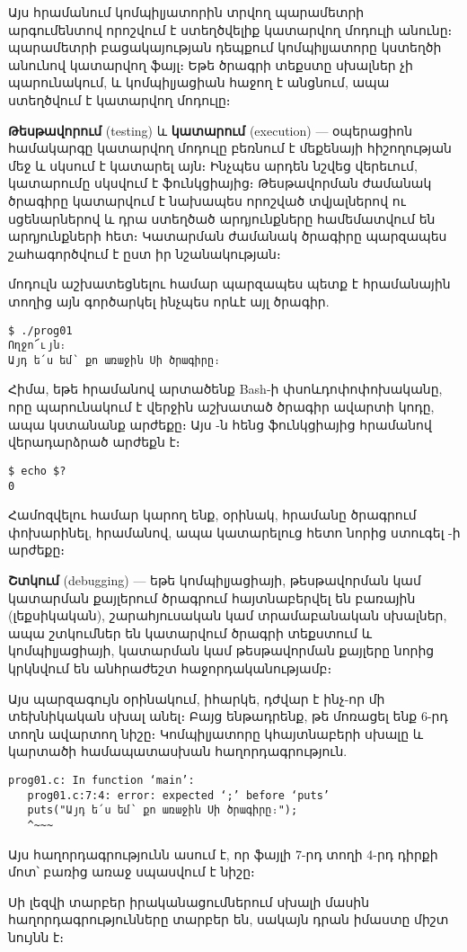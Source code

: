Այս հրամանում կոմպիլյատորին տրվող  պարամետրի արգումենտով
որոշվում է ստեղծվելիք կատարվող մոդուլի անունը։  պարամետրի
բացակայության դեպքում կոմպիլյատորը կստեղծի  անունով
կատարվող ֆայլ։ Եթե ծրագրի տեքստը սխալներ չի պարունակում, և կոմպիլյացիան
հաջող է անցնում, ապա ստեղծվում է  կատարվող մոդուլը։

\textbf{Թեսթավորում} (testing) և \textbf{կատարում} (execution) ---
օպերացիոն համակարգը կատարվող մոդուլը բեռնում է մեքենայի հիշողության
մեջ և սկսում է կատարել այն։ Ինչպես արդեն նշվեց վերեւում, կատարումը
սկսվում է  ֆունկցիայից։ Թեսթավորման ժամանակ ծրագիրը
կատարվում է նախապես որոշված տվյալներով ու սցենարներով և դրա ստեղծած
արդյունքները համեմատվում են արդյունքների հետ։ Կատարման ժամանակ ծրագիրը
պարզապես շահագործվում է ըստ իր նշանակության։

 մոդուլն աշխատեցնելու համար պարզապես պետք է հրամանային
տողից այն գործարկել ինչպես որևէ այլ ծրագիր.

\begin{Verbatim}
$ ./prog01
Ողջո՜ւյն։
Այդ ե՛ս եմ՝ քո առաջին Սի ծրագիրը։
\end{Verbatim}

Հիմա, եթե  հրամանով արտածենք Bash-ի 
փսոևդոփոփոխականը, որը պարունակում է վերջին աշխատած ծրագիր ավարտի
կոդը, ապա կստանանք  արժեքը։ Այս -ն հենց 
ֆունկցիայից  հրամանով վերադարձրած արժեքն է։

\begin{Verbatim}
$ echo $?
0
\end{Verbatim}

Համոզվելու համար կարող ենք, օրինակ,  հրամանը
ծրագրում փոխարինել,  հրամանով, ապա կատարելուց
հետո նորից ստուգել -ի արժեքը։

\textbf{Շտկում} (debugging) --- եթե կոմպիլյացիայի, թեսթավորման
կամ կատարման քայլերում ծրագրում հայտնաբերվել են բառային (լեքսիկական),
շարահյուսական կամ տրամաբանական սխալներ,  ապա շտկումներ են կատարվում
ծրագրի տեքստում և կոմպիլյացիայի, կատարման կամ թեսթավորման քայլերը
նորից կրկնվում են անհրաժեշտ հաջորդականությամբ։

Այս պարզագույն օրինակում, իհարկե, դժվար է ինչ-որ մի տեխնիկական
սխալ անել։ Բայց ենթադրենք, թե մոռացել ենք 6-րդ տողն ավարտող
\code{;} նիշը։ Կոմպիլյատորը կհայտնաբերի սխալը և կարտածի
համապատասխան հաղորդագրություն.

\begin{Verbatim}
prog01.c: In function ‘main’:
   prog01.c:7:4: error: expected ‘;’ before ‘puts’
   puts("Այդ ե՛ս եմ՝ քո առաջին Սի ծրագիրը։");
   ^~~~
\end{Verbatim}

Այս հաղորդագրությունն ասում է, որ  ֆայլի 7-րդ տողի 4-րդ
դիրքի մոտ՝  բառից առաջ սպասվում է \code{;} նիշը։

Սի լեզվի տարբեր իրականացումներում սխալի մասին հաղորդագրությունները
տարբեր են, սակայն դրան իմաստը միշտ նույնն է։ 
